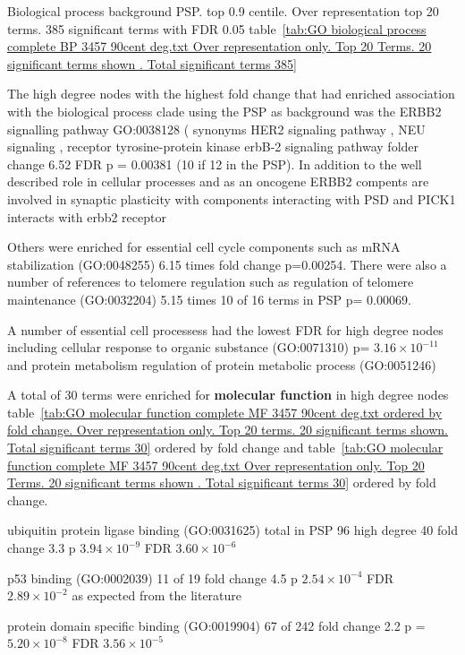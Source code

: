 Biological process background PSP. top 0.9 centile. Over representation top 20 terms. 385 significant terms with FDR 0.05 table~\ref{tab:GO biological process complete BP 3457 90cent deg.txt Over representation only. Top 20 Terms. 20 significant terms shown . Total significant terms 385}

The high degree nodes with the highest fold change that had enriched association with the biological process clade using the PSP as background was the ERBB2 signalling pathway GO:0038128  ( synonyms HER2 signaling pathway , NEU signaling , receptor tyrosine-protein kinase erbB-2 signaling pathway folder change 6.52 FDR p = 0.00381 (10 if 12 in the PSP). In addition to the well described role in cellular processes and as an oncogene \cite{baselga2009novel} ERBB2 compents are involved in synaptic plasticity with components interacting with PSD \cite{funk2020region} and PICK1 interacts with erbb2 receptor \cite{kim2004pdz}


Others were enriched for essential cell cycle components such as  mRNA stabilization (GO:0048255) 6.15 times fold change p=0.00254. There were also a number of references to telomere regulation such as  regulation of telomere maintenance (GO:0032204) 5.15 times 10 of 16 terms in PSP p= 0.00069. 

A number of essential cell processess had the lowest FDR for high degree nodes including cellular response to organic substance (GO:0071310) p= $3.16 \times 10^{-11}$ and    protein metabolism  regulation of protein metabolic process (GO:0051246)

A total of 30 terms were enriched for \textbf{molecular function} in high degree nodes table~\ref{tab:GO molecular function complete MF 3457 90cent deg.txt ordered by fold change. Over representation only. Top 20 terms. 20 significant terms shown. Total significant terms 30} ordered by fold change and table~\ref{tab:GO molecular function complete MF 3457 90cent deg.txt Over representation only. Top 20 Terms. 20 significant terms shown . Total significant terms 30} ordered by fold change. 

ubiquitin protein ligase binding (GO:0031625) total in PSP  96  high degree 40  fold change 3.3 p $3.94 \times 10^{-9}$ FDR $3.60 \times 10^{-6}$ 

 p53 binding (GO:0002039) 11 of 19  fold change 4.5 p $2.54 \times 10^{-4}$ FDR $2.89 \times 10^{-2}$ as expected from the literature 

 protein domain specific binding (GO:0019904) 67 of 242  fold change 2.2 p =  $5.20 \times 10^{-8}$ FDR $3.56 \times 10^{-5}$ 


